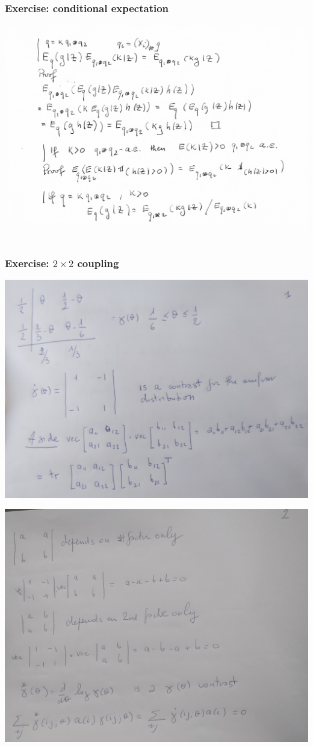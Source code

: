 \documentclass[xcolor=svgnames]{beamer}
\begin{document}
\begin{frame}[plain]\frametitle{Exercise: conditional expectation}

\includegraphics[width=\textwidth]{exercise/bayes-conditional-expectation.pdf}

\end{frame}

\begin{frame}\frametitle{Exercise: $2\times2$ coupling}

\includegraphics[width=\textwidth]{exercise/2x2-coupling-1.jpg}

\includegraphics[width=\textwidth]{exercise/2x2-coupling-2.jpg}
    
\end{frame}
\end{document}
